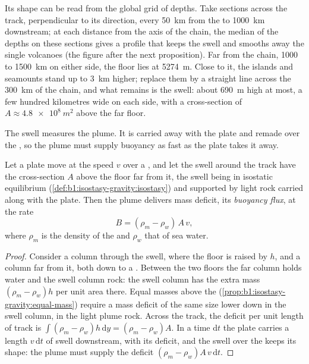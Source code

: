 Its shape can be read from the global grid of depths. Take sections across the
track, perpendicular to its direction, every \qty{50}{km} from the  to
\qty{1000}{km} downstream; at each distance from the axis of the chain, the
median of the depths on these sections gives a profile that keeps the swell and
smooths away the single volcanoes (the figure after the next proposition). Far from the chain, 1000 to
\qty{1500}{km} on either side, the floor lies at \qty{5274}{m}. Close to it,
the islands and seamounts stand up to \qty{3}{km} higher; replace them by a
straight line across the \qty{300}{km} of the chain, and what remains is the
swell: about \qty{690}{m} high at most, a few hundred kilometres wide on each
side, with a cross-section of $A \approx \qty{4.8e8}{m^2}$ above the far
floor.

The swell measures the plume. It is carried away with the plate and remade
over the , so the plume must supply buoyancy as fast as the plate takes
it away.

\begin{proposition}\label{prop:b1:hotspots:buoyancy}
Let a plate move at the speed $v$ over a , and let the swell around the
track have the cross-section $A$ above the floor far from it, the swell being in
isostatic equilibrium (\cref{def:b1:isostasy-gravity:isostasy}) and supported
by light rock carried along with the plate. Then the plume delivers mass
deficit, its \emph{buoyancy flux}, at the rate
\[
  B = (\rho_m - \rho_w)\,A\,v ,
\]
where $\rho_m$ is the density of the  and $\rho_w$ that of sea water.
\end{proposition}

\begin{proof}
Consider a column through the swell, where the floor is raised by $h$, and a
column far from it, both down to a . Between the two floors
the far column holds water and the swell column rock: the swell column has the
extra mass $(\rho_m - \rho_w)h$ per unit area there. Equal masses above the
 (\cref{prop:b1:isostasy-gravity:equal-mass}) require a mass
deficit of the same size lower down in the swell column, in the light plume
rock. Across the track, the deficit per unit length of track is
$\int(\rho_m - \rho_w)h\,\mathrm dy = (\rho_m - \rho_w)A$. In a time
$\mathrm dt$ the plate carries a length $v\,\mathrm dt$ of swell downstream,
with its deficit, and the swell over the  keeps its shape: the plume
must supply the deficit $(\rho_m - \rho_w)A\,v\,\mathrm dt$.
\end{proof}

